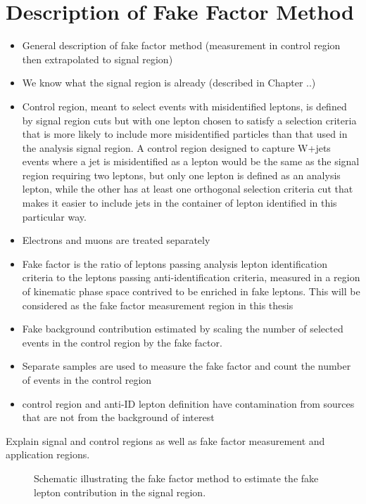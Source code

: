 \section{Description of Fake Factor Method}
\label{sec:FFdesc}
\begin{itemize}
\item General description of fake factor method (measurement in control region then extrapolated to signal region)
\item We know what the signal region is already (described in Chapter ..)
\item Control region, meant to select events with misidentified leptons, is defined by signal region cuts but with one lepton chosen to satisfy a selection criteria that is more likely to include more misidentified particles than that used in the analysis signal region.  A control region designed to capture W+jets events where a jet is misidentified as a lepton would be the same as the signal region requiring two leptons, but only one lepton is defined as an analysis lepton, while the other has at least one orthogonal selection criteria cut that makes it easier to include jets in the container of lepton identified in this particular way.
\item Electrons and muons are treated separately
\item Fake factor is the ratio of leptons passing analysis lepton identification criteria to the leptons passing anti-identification criteria, measured in a region of kinematic phase space contrived to be enriched in fake leptons.  This will be considered as the fake factor measurement region in this thesis
\item Fake background contribution estimated by scaling the number of selected events in the control region by the fake factor.
\item Separate samples are used to measure the fake factor and count the number of events in the control region
\item control region and anti-ID lepton definition have contamination from sources that are not from the background of interest
\end{itemize}

Explain signal and control regions as well as fake factor measurement and application regions. 
\begin{figure}
\centering
 
 \caption{Schematic illustrating the fake factor method to estimate the fake lepton contribution in the signal region.}
 \label{fig:fake_schematic}
 \end{figure}
 
